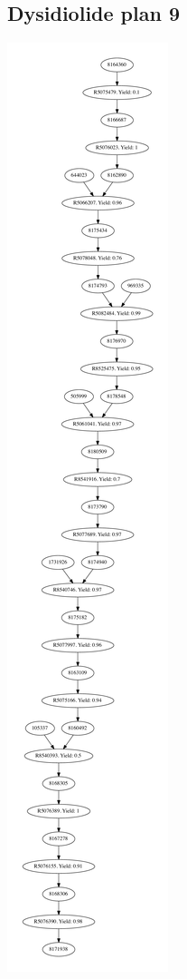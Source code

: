 \documentclass[a4paper,10pt,titlepage]{paper}
\begin{document}
\subsection{Dysidiolide plan 9}
\centering
\includegraphics[scale=0.4]{Synteseplaner/Dysidiolide/plan9.pdf}
\label{Appendix::Dysidiolide9}
\end{document}
